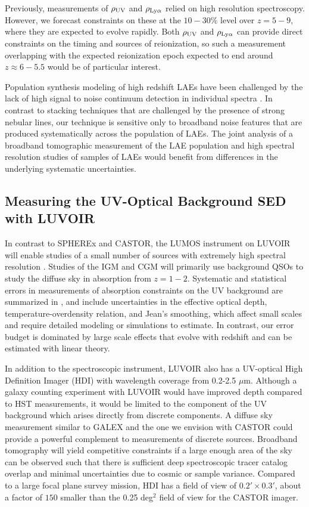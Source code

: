 \documentclass[fleqn,usenatbib]{mnras}
\begin{document}
Previously, measurements of $\rho_{\rm UV}$ and $\rho_{{\rm Ly}\alpha}$ relied on high resolution spectroscopy. However, we forecast constraints on these at the $10-30 \%$ level over $z=5-9$, where they are expected to evolve rapidly. Both $\rho_{\rm UV}$ and $\rho_{{\rm Ly}\alpha}$ can provide direct constraints on the timing and sources of reionization, so such a measurement overlapping with the expected reionization epoch expected to end around $z\approx 6-5.5$ \citep{fan06,kulkarni19,keating20,nasir20} would be of particular interest.

Population synthesis modeling of high redshift LAEs have been challenged by the lack of high signal to noise continuum detection in individual spectra \citep{Lai2008,Bruzual2003}. In contrast to stacking techniques that are challenged by the presence of strong nebular lines, our technique is sensitive only to broadband noise features that are produced systematically across the population of LAEs. The joint analysis of a broadband tomographic measurement of the LAE population and high spectral resolution studies of samples of LAEs would benefit from differences in the underlying systematic uncertainties. 




\subsection{Measuring the UV-Optical Background SED with LUVOIR} 

In contrast to {\small SPHEREx} and {\small CASTOR}, the LUMOS instrument on {\small LUVOIR} will enable studies of a small number of sources with extremely high spectral resolution \citep{LUVOIRfinal}. Studies of the IGM and CGM will primarily use background QSOs to study the diffuse sky in absorption from $z=1-2$. Systematic and statistical errors in measurements of absorption constraints on the UV background are summarized in \citep{Becker2013}, and include uncertainties in the effective optical depth, temperature-overdensity relation, and Jean's smoothing, which affect small scales and require detailed modeling or simulations to estimate. In contrast, our error budget is dominated by large scale effects that evolve with redshift and can be estimated with linear theory.


In addition to the spectroscopic instrument, {\small LUVOIR} also has a UV-optical High Definition Imager (HDI) with wavelength coverage from 0.2-2.5 $\mu$m. Although a galaxy counting experiment with {\small LUVOIR} would have improved depth compared to HST measurements, it would be limited to the component of the UV background which arises directly from discrete components. A diffuse sky measurement similar to {\small GALEX} and the one we envision with {\small CASTOR} could provide a powerful complement to measurements of discrete sources. Broadband tomography will yield competitive constraints if a large enough area of the sky can be observed such that there is sufficient deep spectroscopic tracer catalog overlap and minimal uncertainties due to cosmic or sample variance. Compared to a large focal plane survey mission, HDI has a field of view of $0.2' \times 0.3'$, about a factor of $150$ smaller than the 0.25 deg$^2$ field of view for the {\small CASTOR} imager.
\end{document}

